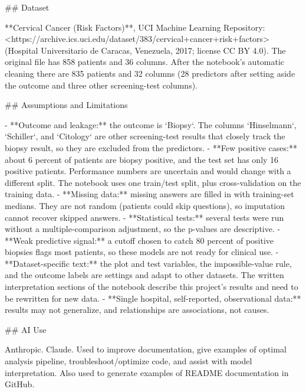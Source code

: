 ## Dataset

**Cervical Cancer (Risk Factors)**, UCI Machine Learning Repository: <https://archive.ics.uci.edu/dataset/383/cervical+cancer+risk+factors> (Hospital Universitario de Caracas, Venezuela, 2017; license CC BY 4.0). The original file has 858 patients and 36 columns. After the notebook's automatic cleaning there are 835 patients and 32 columns (28 predictors after setting aside the outcome and three other screening-test columns).

## Assumptions and Limitations

- **Outcome and leakage:** the outcome is `Biopsy`. The columns `Hinselmann`, `Schiller`, and `Citology` are other screening-test results that closely track the biopsy result, so they are excluded from the predictors.
- **Few positive cases:** about 6 percent of patients are biopsy positive, and the test set has only 16 positive patients. Performance numbers are uncertain and would change with a different split. The notebook uses one train/test split, plus cross-validation on the training data.
- **Missing data:** missing answers are filled in with training-set medians. They are not random (patients could skip questions), so imputation cannot recover skipped answers.
- **Statistical tests:** several tests were run without a multiple-comparison adjustment, so the p-values are descriptive.
- **Weak predictive signal:** a cutoff chosen to catch 80 percent of positive biopsies flags most patients, so these models are not ready for clinical use.
- **Dataset-specific text:** the plot and test variables, the impossible-value rule, and the outcome labels are settings and adapt to other datasets. The written interpretation sections of the notebook describe this project's results and need to be rewritten for new data.
- **Single hospital, self-reported, observational data:** results may not generalize, and relationships are associations, not causes.

 ## AI Use
  
 Anthropic. Claude. Used to improve documentation, give examples of optimal 
analysis pipeline, troubleshoot/optimize code, and assist with model interpretation. 
Also used to generate examples of README documentation in GitHub.

